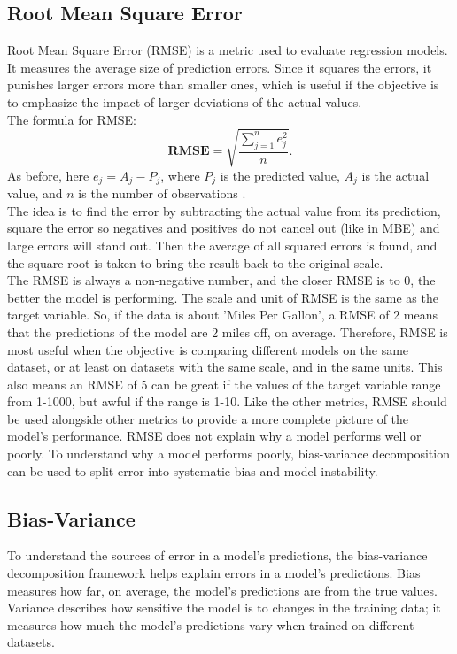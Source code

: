 \newpage

\subsection{Root Mean Square Error}   

Root Mean Square Error (RMSE) is a metric used to evaluate regression models. It measures the average size of prediction errors. Since it squares the errors, it punishes larger errors more than smaller ones, which is useful if the objective is to emphasize the impact of larger deviations of the actual values.
\\
The formula for RMSE:
$$\textbf{RMSE}=\sqrt{\frac{ \sum_{j=1}^{n} e_j^2 }{n}}.$$
As before, here $e_{j}=A_{j}-P_{j}$, where $P_{j}$ is the predicted value, $A_{j}$ is the actual value, and $n$ is the number of observations \cite{metrics}.
\\ The idea is to find the error by subtracting the actual value from its prediction, square the error so negatives and positives do not cancel out (like in MBE) and large errors will stand out. Then the average of all squared errors is found, and the square root is taken to bring the result back to the original scale. 
\\

\noindent The RMSE is always a non-negative number, and the closer RMSE is to 0, the better the model is performing. The scale and unit of RMSE is the same as the target variable. So, if the data is about 'Miles Per Gallon', a RMSE of 2 means that the predictions of the model are 2 miles off, on average. Therefore, RMSE is most useful when the objective is comparing different models on the same dataset, or at least on datasets with the same scale, and in the same units. This also means an RMSE of 5 can be great if the values of the target variable range from 1-1000, but awful if the range is 1-10. Like the other metrics, RMSE should be used alongside other metrics to provide a more complete picture of the model’s performance. RMSE does not explain why a model performs well or poorly. To understand why a model performs poorly, bias-variance decomposition can be used to split error into systematic bias and model instability.
\newpage

\subsection{Bias-Variance}
To understand the sources of error in a model’s predictions, the bias-variance decomposition framework helps explain errors in a model’s predictions. Bias measures how far, on average, the model's predictions are from the true values. Variance describes how sensitive the model is to changes in the training data; it measures how much the model’s predictions vary when trained on different datasets. 


